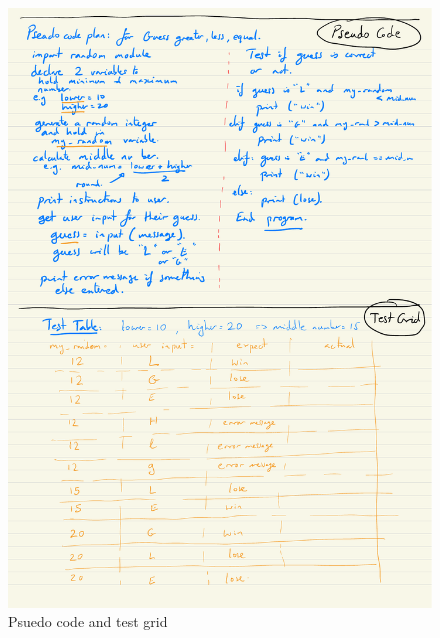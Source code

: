 \documentclass[a4paper,12pt]{article}
\begin{document}
\begin{figure} [!h]
	\centering
	\includegraphics[width=17cm]{iterative_processes/Greater_Less_Equal_planning.pdf}
	\caption*{Psuedo code and test grid}
\end{figure}
\newpage


\newpage
\end{document}
